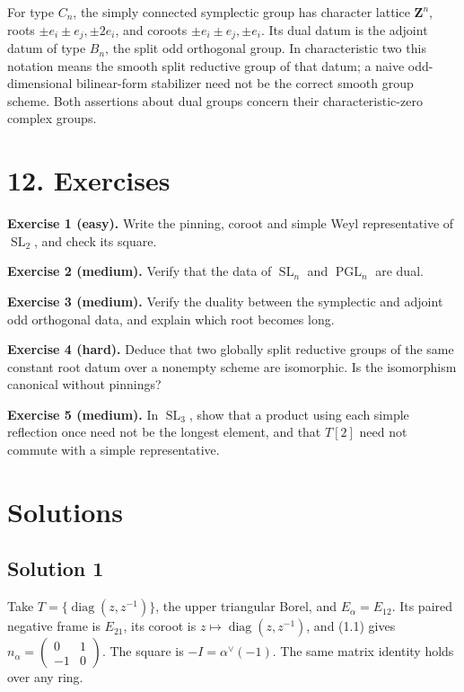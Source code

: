 \documentclass[11pt,a4paper,openany]{report}
\newcounter{none}
\begin{document}
For type \(C_n\), the simply connected symplectic group has character lattice \(\mathbf Z^n\), roots \(\pm e_i\pm e_j,\pm2e_i\), and coroots \(\pm e_i\pm e_j,\pm e_i\). Its dual datum is the adjoint datum of type \(B_n\), the split odd orthogonal group. In characteristic two this notation means the smooth split reductive group of that datum; a naive odd-dimensional bilinear-form stabilizer need not be the correct smooth group scheme. Both assertions about dual groups concern their characteristic-zero complex groups.

\section{12. Exercises}\label{AG-RG-05-exercises}

\textbf{Exercise 1 (easy).} Write the pinning, coroot and simple Weyl representative of \(\operatorname{SL}_2\), and check its square.

\textbf{Exercise 2 (medium).} Verify that the data of \(\operatorname{SL}_n\) and \(\operatorname{PGL}_n\) are dual.

\textbf{Exercise 3 (medium).} Verify the duality between the symplectic and adjoint odd orthogonal data, and explain which root becomes long.

\textbf{Exercise 4 (hard).} Deduce that two globally split reductive groups of the same constant root datum over a nonempty scheme are isomorphic. Is the isomorphism canonical without pinnings?

\textbf{Exercise 5 (medium).} In \(\operatorname{SL}_3\), show that a product using each simple reflection once need not be the longest element, and that \(T[2]\) need not commute with a simple representative.

\section{Solutions}\label{AG-RG-05-solutions}

\subsection{Solution 1}\label{AG-RG-05-solution-1}

Take \(T=\{\operatorname{diag}(z,z^{-1})\}\), the upper triangular Borel, and \(E_\alpha=E_{12}\). Its paired negative frame is \(E_{21}\), its coroot is \(z\mapsto\operatorname{diag}(z,z^{-1})\), and (1.1) gives \(n_\alpha=\left(\begin{smallmatrix}0&1\\-1&0\end{smallmatrix}\right)\). The square is \(-I=\alpha^\vee(-1)\). The same matrix identity holds over any ring.
\end{document}
